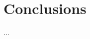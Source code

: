\documentclass[acmtocl]{acmtrans2m}
\newcommand{\comment}[1]{}
\begin{document}
\section{Conclusions}


\comment{
\begin{acks}
We would like to thank the anonymous reviewers of VEE 2005, whose
comments greatly improved an earlier version of this paper.
\end{acks}
}




\begin{received}
...
\end{received}
\end{document}
